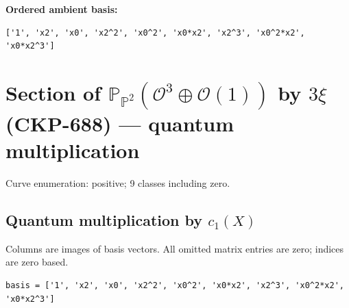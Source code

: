 \documentclass[10pt,a4paper]{article}
\begin{document}
\textbf{Ordered ambient basis:}
\begin{lstlisting}
['1', 'x2', 'x0', 'x2^2', 'x0^2', 'x0*x2', 'x2^3', 'x0^2*x2', 'x0*x2^3']
\end{lstlisting}

\clearpage\section*{Section of $\mathbb P_{\mathbb P^{2}}(\mathcal O^{3}\oplus \mathcal O(1))$ by $3\xi $ (CKP-688) --- quantum multiplication}

Curve enumeration: positive; 9 classes including zero.
\subsection*{Quantum multiplication by $c_1(X)$}
Columns are images of basis vectors. All omitted matrix entries are zero; indices are zero based.

\begin{lstlisting}
basis = ['1', 'x2', 'x0', 'x2^2', 'x0^2', 'x0*x2', 'x2^3', 'x0^2*x2', 'x0*x2^3']
\end{lstlisting}
\end{document}
